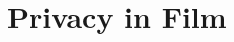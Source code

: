 \documentclass{beamer}
\begin{document}
\begin{frame}
\begin{columns}[c]
\begin{figure}
    \end{figure}

    \end{columns}



\end{frame}

\section{Privacy in Film}








\end{document}
